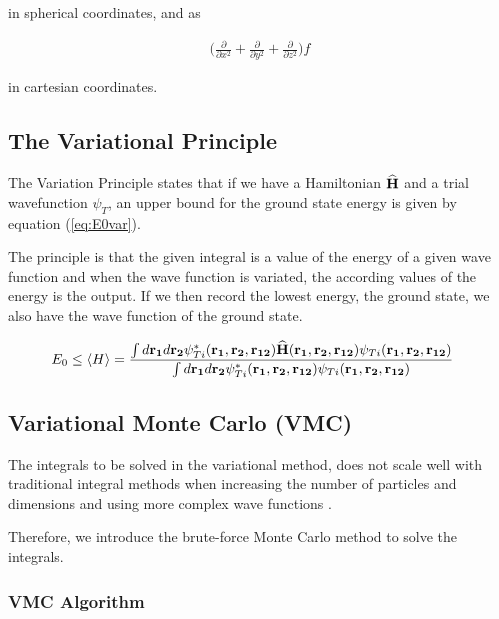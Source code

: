 \documentclass[twocolumn]{article}[10pt]
\newcommand{\eq}[1]{\begin{align*}#1\end{align*}}
\newcommand{\equ}[1]{\begin{align}#1\end{align}}
\newcommand{\OP}[1]{{\bf\widehat{#1}}}
\begin{document}
in spherical coordinates, and as

{\small
\eq{
	\bigg( 
	\frac{\partial}{\partial x^2} +
	\frac{\partial}{\partial y^2} +
	\frac{\partial}{\partial z^2}
	\bigg) f
}}%

in cartesian coordinates.

\subsection{The Variational Principle}
The Variation Principle states that if we have a Hamiltonian
$\OP H$ and a trial wavefunction $\psi_{T}$,
an upper bound for the ground state energy is given by
equation (\ref{eq:E0var}). 

The principle is that the given integral is a
value of the energy of a given wave function and when the wave function
is variated, the according values of the energy is the output. If we then
record the lowest energy, the ground state, we also have the wave function
of the ground state. 
\begin{strip}
{
\equ{
	&E_0 \leq
	\langle H \rangle =
	\frac{\int d{\bf r_1}d{\bf r_2}\psi^{\ast}_{Ti}({\bf r_1},{\bf r_2}, 
	{\bf r_{12}})
	\OP{H}({\bf r_1},{\bf r_2}, {\bf r_{12}})
	\psi_{Ti}({\bf r_1},{\bf r_2}, {\bf r_{12}})}
	{\int d{\bf r_1}d{\bf r_2}\psi^{\ast}_{Ti}({\bf r_1},{\bf r_2}, {\bf r_{12}})
	\psi_{Ti}({\bf r_1},{\bf r_2}, {\bf r_{12}})}\label{eq:E0var}
}}%
\end{strip}


\subsection{Variational Monte Carlo (VMC)}
The integrals to be solved in the variational method,
does not scale well with traditional integral methods when 
increasing the number of particles and dimensions and using 
more complex wave functions .

Therefore, we introduce the brute-force Monte Carlo method
to solve the integrals.

\subsubsection{VMC Algorithm}
\end{document}
